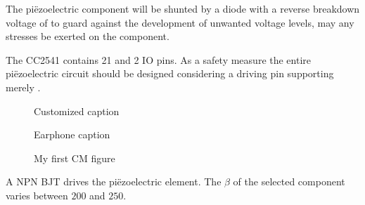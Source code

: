 The pi\"ezoelectric component will be shunted by a diode with a reverse 
breakdown voltage of  to guard against the development 
of unwanted voltage levels, may any stresses be exerted on the component.

The CC2541 contains 21  and 
2  IO pins. As a safety measure the entire 
pi\"ezoelectric circuit should be designed considering a driving pin 
supporting merely .

\begin{figure}[hbt]
	
	\centerline{\box\graph}
	\caption{Customized caption}
	\label{symlabelforquick}
\end{figure}
\begin{figure}[hbt]
	
	\centerline{\box\graph}
	\caption{Earphone caption}
	\label{symlabelforearphone}
\end{figure}
\begin{figure}[hbt]
	
	\centerline{\box\graph}
	\caption{My first CM figure}
	\label{symlabelforme}
\end{figure}
%
A NPN BJT drives the pi\"ezoelectric element. The $\beta$ of the selected
component varies between $200$ and $250$.
%
%



%

